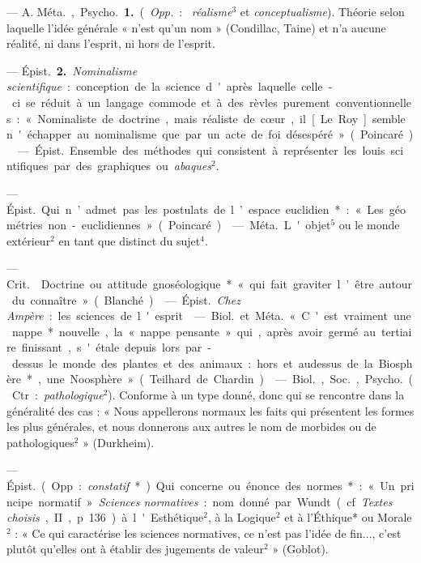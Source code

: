 \begin{itemize}[leftmargin=1cm, label=, itemsep=1pt]
 — A. \si{Méta.}, \si{Psycho.} {\bf 1.} ({\it Opp.} : {\it
réalisme}$^3$ et {\it conceptualisme}). Théorie selon laquelle l’idée générale
« n’est qu’un nom » (Condillac, Taine) et n'a aucune réalité, ni dans
l'esprit, ni hors de l'esprit.

— \si{Épist.} {\bf 2.} {\it Nominalisme scientifique} : conception de la
science d'après laquelle celle-ci se réduit à un langage commode et à des
rèvles purement conventionnelles : « Nominaliste de doctrine, mais réaliste
de cœur, il [Le Roy] semble n'échapper au nominalisme que par un acte de foi
désespéré » (Poincaré).

 — \si{Épist.} Ensemble des méthodes qui consistent à
représenter les louis sci ntifiques par des graphiques ou {\it abaques}$^2$.

 — \si{Épist.} Qui n’admet pas les postulats de l’espace
euclidien* : « Les géométries non-euclidiennes » (Poincaré).

 — \si{Méta.} L'objet$^5$ ou le
monde extérieur$^2$ en tant que distinct du sujet$^4$.

 — \si{Crit.}  Doctrine ou attitude
gnoséologique* « qui fait graviter l’être autour du connaître» (Blanché).

 — \si{Épist.} {\it Chez
Ampère} : les sciences de l'esprit.

 — \si{Biol.} et \si{Méta.} « C'est vraiment une nappe*
nouvelle, la « nappe pensante » qui, après avoir germé au tertiaire
finissant, s'étale depuis lors par-dessus le monde des plantes et des
animaux : hors et audessus de la Biosphère*, une Noosphère » (Teilhard de
Chardin).

 — \si{Biol.}, \si{Soc.}, \si{Psycho.} (Ctr. :
{\it pathologique}$^2$). Conforme à un type donné, donc qui se rencontre dans
la généralité des cas : « Nous appellerons normaux les faits qui présentent
les formes les plus générales, et nous donnerons aux autres le
nom de morbides ou de pathologiques$^2$ » (Durkheim).

 — \si{Épist.} (Opp. : {\it constatif}*) Qui concerne ou énonce
des normes*: « Un principe normatif ». {\it Sciences normatives} : nom donné
par Wundt (cf. {\it Textes choisis}, II, p. 136) à l'Esthétique$^2$, à la
Logique$^2$ et à l'Éthique* ou Morale$^2$ : « Ce qui caractérise les sciences
normatives, ce n’est pas l'idée de fin..., c’est plutôt qu’elles ont à
établir des jugements de valeur$^2$ » (Goblot).


\end{itemize}

